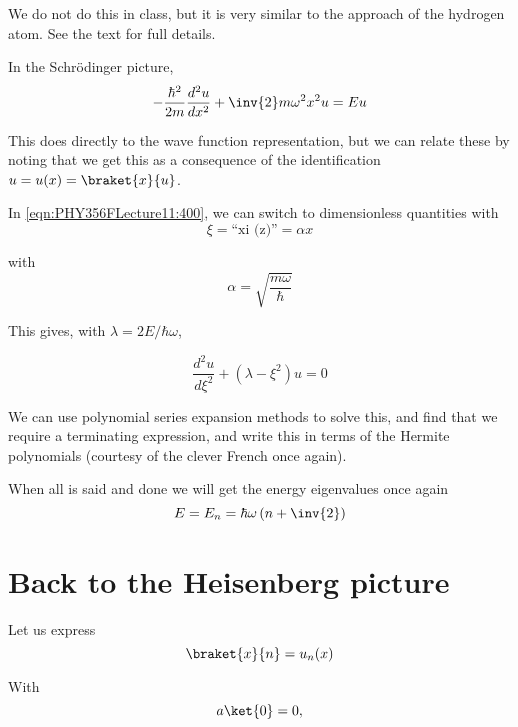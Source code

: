We do not do this in class, but it is very similar to the approach of the hydrogen atom.  See the text for full details.

In the Schr\"{o}dinger picture,
\begin{equation}\label{eqn:PHY356FLecture11:400}
-\frac{\hbar^2}{2m} \frac{d^2 u}{dx^2} + \inv{2} m \omega^2 x^2 u = E u
\end{equation}

This does directly to the wave function representation, but we can relate these by noting that we get this as a consequence of the identification $u = u(x) = \braket{x}{u}$.

In \ref{eqn:PHY356FLecture11:400}, we can switch to dimensionless quantities with
\begin{equation}\label{eqn:PHY356FLecture11:410}
\xi = \text{``xi (z)''} = \alpha x
\end{equation}

with
\begin{equation}\label{eqn:PHY356FLecture11:411}
\alpha = \sqrt{\frac{m \omega}{\hbar}}
\end{equation}

This gives, with $\lambda = 2E/\hbar\omega$,

\begin{equation}\label{eqn:PHY356FLecture11:420}
\frac{d^2 u}{d\xi^2} + (\lambda - \xi^2) u = 0
\end{equation}

We can use polynomial series expansion methods to solve this, and find that we require a terminating expression, and write this in terms of the Hermite polynomials (courtesy of the clever French once again).

When all is said and done we will get the energy eigenvalues once again
\begin{equation}\label{eqn:PHY356FLecture11:430}
E = E_n = \hbar \omega \left( n + \inv{2} \right)
\end{equation}

\section{Back to the Heisenberg picture}

Let us express
\begin{equation}\label{eqn:PHY356FLecture11:500}
\braket{x}{n} = u_n(x)
\end{equation}

With
\begin{equation}\label{eqn:PHY356FLecture11:510}
a \ket{0} = 0,
\end{equation}

